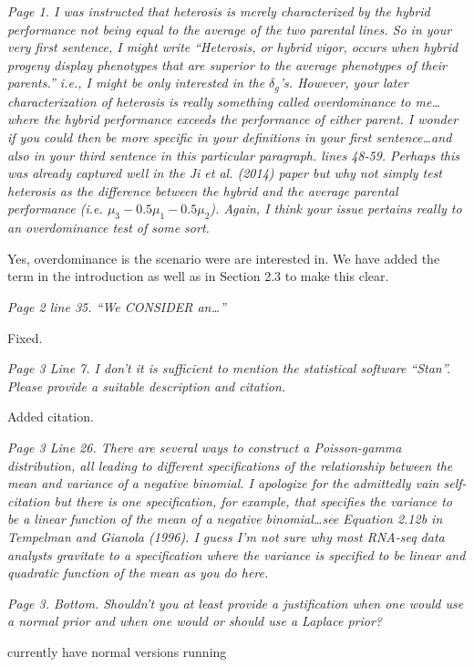 \documentclass{article}
\newcommand{\comment}[1]{\textit{#1}}
\newcommand{\response}[1]{#1}
\newcommand{\todo}[1]{{\color{red} #1}}
\begin{document}
\comment{Page 1.  I was instructed that heterosis is merely characterized by the hybrid performance not being equal to the average of the two parental lines.  So in your very first sentence, I might write “Heterosis, or hybrid vigor, occurs when hybrid progeny display phenotypes that are superior to the average phenotypes of their parents.” i.e., I might be only interested in the $\delta_g$’s. However, your later characterization of heterosis is really something called overdominance to me…where the hybrid performance exceeds the performance of either parent.  I wonder if you could then be more specific in your definitions in your first sentence…and also in your third sentence in this particular paragraph. lines 48-59.  Perhaps this was already captured well in the Ji et al. (2014) paper but why not simply test heterosis as the difference between the hybrid and the average parental performance (i.e. $\mu_3 - 0.5 \mu_1 - 0.5 \mu_2$).  Again, I think your issue pertains really to an overdominance test of some sort.}

\response{Yes, overdominance is the scenario were are interested in. We have added the term in the introduction as well as in Section 2.3 to make this clear.}

\comment{Page 2 line 35.  “We CONSIDER an…”}

\response{Fixed.}

\comment{Page 3 Line 7.  I don’t it is sufficient to mention the statistical software “Stan”.  Please provide a suitable description and citation.}

\response{Added citation.}

\comment{Page 3 Line 26.  There are several ways to construct a Poisson-gamma distribution, all leading to different specifications of the relationship between the mean and variance of a negative binomial.  I apologize for the admittedly vain self-citation but there is one specification, for example, that specifies the variance to be a linear function of the mean of a negative binomial…see Equation 2.12b in  Tempelman and Gianola (1996).  I guess I’m not sure why most RNA-seq data analysts gravitate to a specification where the variance is specified to be linear and quadratic function of the mean as you do here.}

\comment{Page 3. Bottom.  Shouldn’t you at least provide a justification when one would use a normal prior and when one would or should use a Laplace prior?}

\todo{currently have normal versions running}
\end{document}
